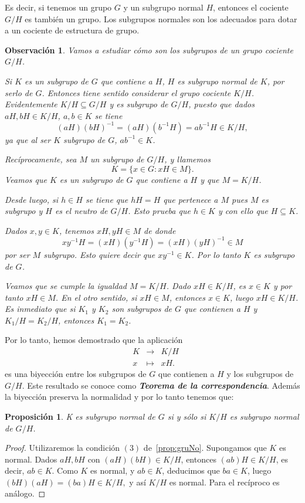 \documentclass[12pt]{article}
\newtheorem{proposition}[theorem]{Proposición}
\newtheorem{observation}{Observación}[theorem]
\begin{document}
Es decir, si tenemos un grupo $G$ y un subgrupo normal $H$, entonces el cociente $G/H$ es también un grupo. Los subgrupos normales son los adecuados para dotar a un cociente de estructura de grupo. 

\begin{observation}\label{ob:subGruCo} Vamos a estudiar cómo son los subgrupos de un grupo cociente $G/H$.

Si $K$ es un subgrupo de $G$ que contiene a $H$, $H$ es subgrupo normal de $K$, por serlo de $G$. Entonces tiene sentido considerar el grupo cociente $K/H$. Evidentemente $K/H \subseteq G/H$ y es subgrupo de $G/H$, puesto que dados $aH, bH \in K/H$, $a,b \in K$ se tiene $$(aH)(bH)^{-1} = (aH)(b^{-1}H) = ab^{-1}H \in K/H,$$ ya que al ser $K$ subgrupo de $G$, $ab^{-1} \in K$.

Recíprocamente, sea $M$ un subgrupo de $G/H$, y llamemos $$K = \lbrace x \in G : xH \in M \rbrace.$$ Veamos que $K$ es un subgrupo de $G$ que contiene a $H$ y que $M = K/H$.

Desde luego, si $h \in H$ se tiene que $hH = H$ que pertenece a $M$ pues $M$ es subgrupo y $H$ es el neutro de $G/H$. Esto prueba que $h \in K$ y con ello que $H \subseteq K$.

Dados $x,y \in K$, tenemos $xH, yH \in M$ de donde $$xy^{-1}H = (xH)(y^{-1}H) = (xH)(yH)^{-1} \in M$$ por ser $M$ subgrupo. Esto quiere decir que $xy^{-1} \in K$. Por lo tanto $K$ es subgrupo de $G$.

Veamos que se cumple la igualdad $M = K/H$. Dado $xH \in K/H$, es $x \in K$ y por tanto $xH \in M$. En el otro sentido, si $xH \in M$, entonces $x \in K$, luego $xH \in K/H$. Es inmediato que si $K_{1}$ y $K_{2}$ son subgrupos de $G$ que contienen a $H$ y $K_{1}/H = K_{2}/H$, entonces $K_{1} = K_{2}$.
\end{observation}

Por lo tanto, hemos demostrado que la aplicación $$\begin{array}{rccl}
&K & \longrightarrow & K/H\\
&x & \longmapsto &xH.
\end{array}
$$ es una biyección entre los subgrupos de $G$ que contienen a $H$ y los subgrupos de $G/H$. Este resultado se conoce como \textbf{\textit{Teorema de la correspondencia}}. Además la biyección preserva la normalidad y por lo tanto tenemos que:

\begin{proposition} K es subgrupo normal de $G$ si y sólo si $K/H$ es subgrupo normal de $G/H$.\end{proposition}
\begin{proof}
Utilizaremos la condición $(3)$ de~\ref{prop:gruNo}. Supongamos que $K$ es normal. Dados $aH, bH$ con $(aH)(bH) \in K/H$, entonces $(ab)H \in K/H$, es decir, $ab \in K$.
Como $K$ es normal, y $ab \in K$, deducimos que $ba \in K$, luego $(bH)(aH) = (ba)H \in K/H,$ y así $K/H$ es normal. Para el recíproco es análogo.

\end{proof}
\end{document}
